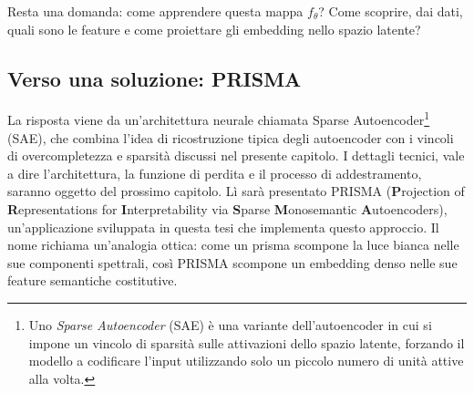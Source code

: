 Resta una domanda: come apprendere questa mappa $f_\theta$? Come scoprire, dai dati, quali sono le feature e come proiettare gli embedding nello spazio latente?

\subsection{Verso una soluzione: PRISMA}
\label{subsec:verso_soluzione}
La risposta viene da un'architettura neurale chiamata Sparse Autoencoder\footnote{Uno \textit{Sparse Autoencoder} (SAE) è una variante dell'autoencoder in cui si impone un vincolo di sparsità sulle attivazioni dello spazio latente, forzando il modello a codificare l'input utilizzando solo un piccolo numero di unità attive alla volta.} (SAE), che combina l'idea di ricostruzione tipica degli autoencoder con i vincoli di overcompletezza e sparsità discussi nel presente capitolo. I dettagli tecnici, vale a dire l'architettura, la funzione di perdita e il processo di addestramento, saranno oggetto del prossimo capitolo.
Lì sarà presentato PRISMA (\textbf{P}rojection of \textbf{R}epresentations for \textbf{I}nterpretability via \textbf{S}parse \textbf{M}onosemantic \textbf{A}utoencoders), un'applicazione sviluppata in questa tesi che implementa questo approccio. Il nome richiama un'analogia ottica: come un prisma scompone la luce bianca nelle sue componenti spettrali, così PRISMA scompone un embedding denso nelle sue feature semantiche costitutive.